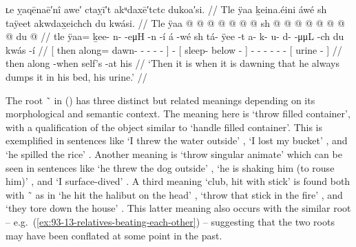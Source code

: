 \ex\label{ex:93-10-dump-urine}%
%
\begingl
	\glpreamble	ʟe ỵaqēnaē′nî awe′ ctaỵī′t akᵘdaxē′tctc dukoa′si. //
	\glpreamble	Tle ÿaa ḵeina.éini áwé sh taÿeet akwdax̱eichch du kwási. //
	\gla	{} Tle ÿaa @  @ {} @ {} @ {} @ {} @ {} {}
		 @ {}
		{} sh  @ {} @ {} {}
		 @ {} @ {} @ {} @ {} @ {} @ {}
		{} du  @ {} {} //
	\glb	{} tle ÿaa= ḵee- n-  -eμH -n -í {}
		á -wé
		{} sh tá- ÿee -t {}
		a- k- u- d-  -μμL -ch
		{} du kwás -í {} //
	\glc	{}[ then along= dawn- -  - - - {}]
		 -
		{}[  sleep- below - {}]
		- - - -  - -
		{}[  urine - {}] //
	\gld	{} then along  {} {} {} {} -when {}
		 {}
		{} self’s  {} -at {}
		 {} {} {} {} {} {}
		{} his  {} {} //
	\glft	‘Then it is when it is dawning that he always dumps it in his bed, his urine.’
		//
\endgl
\xe

The root  \~\  in (\lastx) has three distinct but related meanings depending on its morphological and semantic context.
The meaning here is ‘throw filled container’, with a qualification of the object similar to  ‘handle filled container’.
This is exemplified in sentences like  ‘I threw the water outside’ \parencite[227.3218]{story-naish:1973},  ‘I lost my bucket’ \parencite[129.1716]{story-naish:1973}, and  ‘he spilled the rice’ \parencite[203.2841]{story-naish:1973}.
Another meaning is ‘throw singular animate’ which can be seen in sentences like  ‘he threw the dog outside’ \parencite[227.3216]{story-naish:1973},  ‘he is shaking him (to rouse him)’ \parencite[186.2569]{story-naish:1973}, and  ‘I surface-dived’ \parencite[71.848]{story-naish:1973}.
A third meaning ‘club, hit with stick’ is found both with  \~\  as in  ‘he hit the halibut on the head’ \parencite[109.1425]{story-naish:1973},  ‘throw that stick in the fire’ \parencite[f02/59]{leer:1973}, and  ‘they tore down the house’ \parencite[225.3169]{story-naish:1973}.
This latter meaning also occurs with the similar root  – e.g.\ (\ref{ex:93-13-relatives-beating-each-other}) – suggesting that the two roots may have been conflated at some point in the past.

